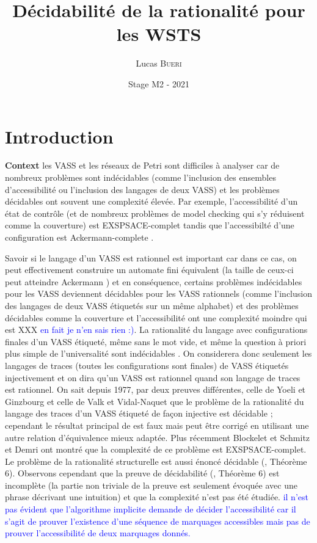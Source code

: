 \documentclass[a4paper,final]{article}
\title{Décidabilité de la rationalité pour les WSTS}
\author{Lucas \textsc{Bueri}}
\date{Stage M2 - 2021}
\theoremstyle{definition}
\newcommand{\alain}[1]{\textcolor{blue}{#1}}
\begin{document}
\maketitle


\section{Introduction}

{\bf Context} les VASS et les  réseaux de Petri sont difficiles à analyser car de nombreux problèmes sont indécidables (comme l'inclusion des ensembles d'accessibilité ou l'inclusion des langages de deux VASS) et les problèmes décidables ont souvent une complexité élevée. Par exemple, l'accessibilité d'un état de contrôle (et de nombreux problèmes de model checking qui s'y réduisent comme la couverture) est EXSPSACE-complet tandis que l'accessibilté d'une configuration est Ackermann-complete \cite{DBLP:journals/corr/abs-2104-12695,DBLP:journals/corr/abs-2105-08551}. 

Savoir si le langage d'un VASS est rationnel est important car dans ce cas, on peut effectivement construire un automate fini équivalent (la taille de ceux-ci peut atteindre Ackermann \cite{vavn81}) et en conséquence, certains problèmes indécidables pour les VASS deviennent décidables pour les VASS rationnels (comme l'inclusion des langages de deux VASS étiquetés sur un même alphabet) et des problèmes décidables comme la couverture et l'accessibilité ont une complexité moindre qui est XXX \alain{en fait je n'en sais rien :)}. La rationalité du langage avec configurations finales d'un VASS étiqueté, même sans le mot vide, et même la question à priori plus simple de l'universalité sont indécidables \cite{giyo80}. On considerera donc seulement les langages de traces (toutes les configurations sont finales) de VASS étiquetés injectivement et on dira qu'un VASS est rationnel quand son langage de traces est rationnel. On sait depuis 1977, par deux preuves différentes, celle de Yoeli et Ginzbourg  \cite{giyo80} et celle de Valk et Vidal-Naquet \cite{DBLP:conf/tcs/ValkV77,giyo80} que le problème de la rationalité du langage des traces d'un VASS étiqueté de façon injective est décidable \cite{giyo80,vavn81}; cependant le résultat principal de \cite{giyo80} est faux mais peut être corrigé en utilisant une autre relation d'équivalence mieux adaptée. Plus récemment Blockelet et Schmitz \cite{DBLP:conf/mfcs/BlockeletS11} et Demri \cite{DBLP:journals/jcss/Demri13} ont montré que la complexité de ce problème est EXSPSACE-complet. 
Le problème de la rationalité structurelle est aussi énoncé décidable (\cite{vavn81}, Théorème 6). 
Observons cependant que la preuve de décidabilité (\cite{vavn81}, Théorème 6) est incomplète (la partie non triviale de la preuve est seulement évoquée avec une phrase décrivant une intuition) et que la complexité n'est pas été étudiée.
\alain{	il n'est pas évident que l'algorithme implicite demande de décider l'accessibilité car il s'agit de prouver l'existence d'une séquence de marquages accessibles mais pas de prouver l'accessibilité de deux marquages donnés.} 
\end{document}
